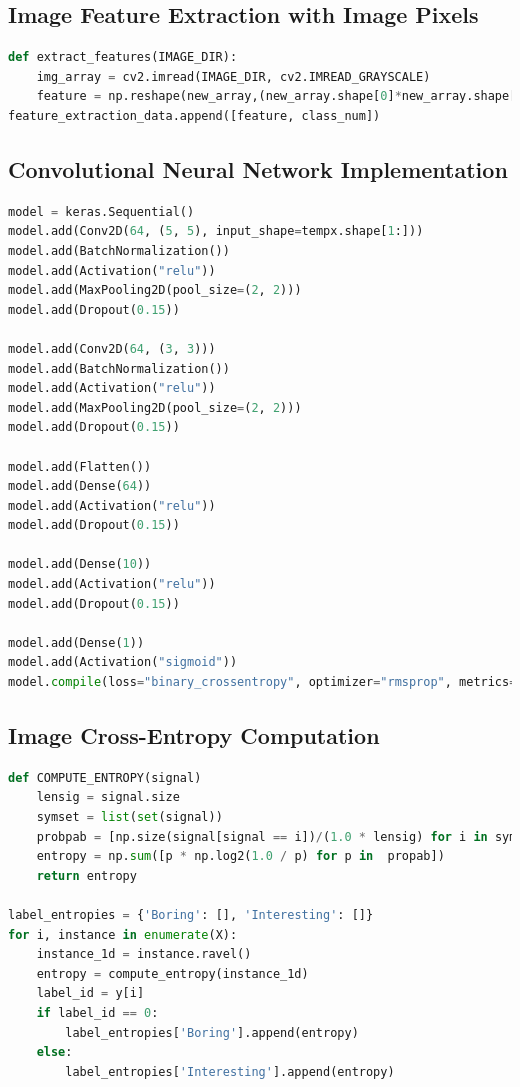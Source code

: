 \documentclass[12pt]{article}
\numberwithin{figure}{section} %
\begin{document}
\subsection{Image Feature Extraction with Image Pixels}
\label{subsection:Image Feature Extraction with Image Pixels}
\begin{lstlisting}[language = Python]
def extract_features(IMAGE_DIR): 
    img_array = cv2.imread(IMAGE_DIR, cv2.IMREAD_GRAYSCALE)
    feature = np.reshape(new_array,(new_array.shape[0]*new_array.shape[1]))
feature_extraction_data.append([feature, class_num])  
\end{lstlisting}

\subsection{Convolutional Neural Network Implementation}
\label{subsection:Convolutional Neural Network Implementation}
\begin{lstlisting}[language = Python]
model = keras.Sequential()
model.add(Conv2D(64, (5, 5), input_shape=tempx.shape[1:]))
model.add(BatchNormalization())
model.add(Activation("relu"))
model.add(MaxPooling2D(pool_size=(2, 2)))
model.add(Dropout(0.15))

model.add(Conv2D(64, (3, 3)))
model.add(BatchNormalization())
model.add(Activation("relu"))
model.add(MaxPooling2D(pool_size=(2, 2)))
model.add(Dropout(0.15))

model.add(Flatten())
model.add(Dense(64))
model.add(Activation("relu"))
model.add(Dropout(0.15))

model.add(Dense(10))
model.add(Activation("relu"))
model.add(Dropout(0.15))

model.add(Dense(1))
model.add(Activation("sigmoid"))
model.compile(loss="binary_crossentropy", optimizer="rmsprop", metrics=["accuracy"])
\end{lstlisting}

\subsection{Image Cross-Entropy Computation}
\label{subsection:Image Cross-Entropy Computation}
\begin{lstlisting}[language = Python]
def COMPUTE_ENTROPY(signal)
    lensig = signal.size
    symset = list(set(signal))
    probpab = [np.size(signal[signal == i])/(1.0 * lensig) for i in symset]
    entropy = np.sum([p * np.log2(1.0 / p) for p in  propab])
    return entropy

label_entropies = {'Boring': [], 'Interesting': []}
for i, instance in enumerate(X):
    instance_1d = instance.ravel()
    entropy = compute_entropy(instance_1d)
    label_id = y[i]
    if label_id == 0:
        label_entropies['Boring'].append(entropy)
    else:
        label_entropies['Interesting'].append(entropy)
\end{lstlisting}
\end{document}
